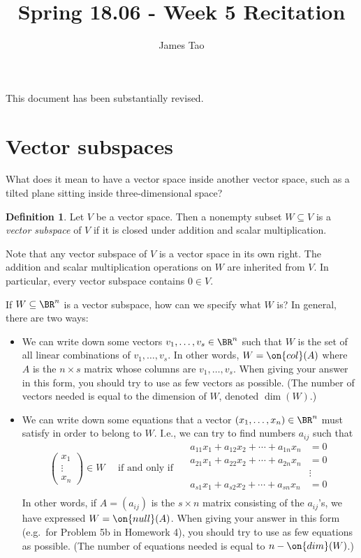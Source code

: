 \documentclass[10pt]{amsart}
\title{Spring 18.06 - Week 5 Recitation}
\author{James Tao}
\theoremstyle{mythm}
\theoremstyle{definition}
\newtheorem*{defn}{Definition}
\theoremstyle{myrmk}
\begin{document}
	\thispagestyle{fancy}
	
	This document has been substantially revised. 
	
	\section{Vector subspaces} 
	
	What does it mean to have a vector space inside another vector space, such as a tilted plane sitting inside three-dimensional space? 
	
	\begin{defn}
		Let $V$ be a vector space. Then a nonempty subset $W \subseteq V$ is a \emph{vector subspace} of $V$ if it is closed under addition and scalar multiplication. 
	\end{defn}
	
	Note that any vector subspace of $V$ is a vector space in its own right. The addition and scalar multiplication operations on $W$ are inherited from $V$. In particular, every vector subspace contains $0 \in V$. 
	
	If $W \subseteq \BR^n$ is a vector subspace, how can we specify what $W$ is? In general, there are two ways: 
	\begin{itemize}
		\item We can write down some vectors $v_1, \ldots, v_s \in \BR^n$ such that $W$ is the set of all linear combinations of $v_1, \ldots, v_s$. In other words, $W = \on{col}(A)$ where $A$ is the $n \times s$ matrix whose columns are $v_1, \ldots, v_s$. When giving your answer in this form, you should try to use as few vectors as possible. (The number of vectors needed is equal to the dimension of $W$, denoted $\dim(W)$.) 
		\item We can write down some equations that a vector $(x_1, \ldots, x_n) \in \BR^n$ must satisfy in order to belong to $W$. I.e., we can try to find numbers $a_{ij}$ such that 
		\[
			\begin{pmatrix}
			x_1 \\ \vdots \\ x_n 
			\end{pmatrix} \in W \quad \text{ if and only if } \quad \begin{aligned}
				a_{11}x_1 + a_{12}x_2 + \cdots + a_{1n}x_n &= 0 \\
				a_{21}x_1 + a_{22}x_2 + \cdots + a_{2n}x_n &= 0 \\ 
				&\vdots \\
				a_{s1}x_1 + a_{s2}x_2 + \cdots + a_{sn}x_n &= 0 \\
			\end{aligned}
		\]
		In other words, if $A = (a_{ij})$ is the $s \times n$ matrix consisting of the $a_{ij}$'s, we have expressed $W = \on{null}(A)$. 
		When giving your answer in this form (e.g.\ for Problem 5b in Homework 4), you should try to use as few equations as possible. (The number of equations needed is equal to $n - \on{dim}(W)$.) 
	\end{itemize}
	
\end{document}
